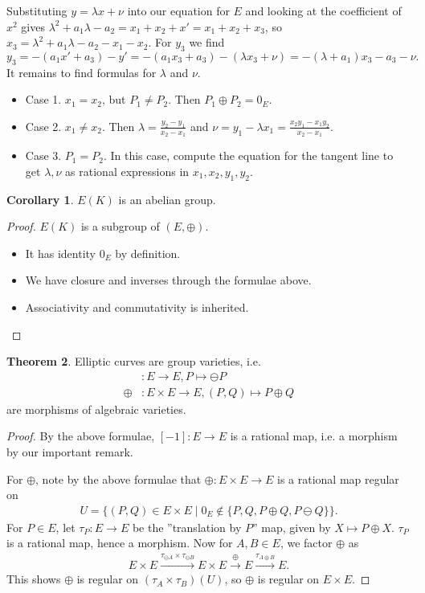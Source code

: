 \documentclass{article}
\theoremstyle{definition}
\newtheorem{theorem}{Theorem}[section]
\newtheorem{cor}[theorem]{Corollary}
\begin{document}
Substituting $y = \lambda x + \nu$ into our equation for $E$ and looking at the coefficient of $x^2$ gives $\lambda^2 + a_1 \lambda - a_2 = x_1 + x_2 + x' = x_1 + x_2 + x_3$, so $x_3 = \lambda^2 +a_1 \lambda - a_2 - x_1 - x_2$. For $y_3$ we find $$y_3 = -(a_1x' + a_3) - y' = -(a_1x_3+a_3) - (\lambda x_3  + \nu) = - (\lambda+a_1)x_3 - a_3 - \nu.$$
It remains to find formulas for $\lambda$ and $\nu$.
\begin{itemize}
    \item Case 1. $x_1 = x_2$, but $P_1 \neq P_2$. Then $P_1 \oplus P_2 = 0_E$.
    \item Case 2. $x_1 \neq x_2$. Then $\lambda = \frac{y_2-y_1}{x_2-x_1}$ and $\nu = y_1 - \lambda x_1 = \frac{x_2y_1-x_1y_2}{x_2-x_1}$.
    \item Case 3. $P_1 = P_2$. In this case, compute the equation for the tangent line to get $\lambda, \nu$ as rational expressions in $x_1,x_2,y_1,y_2$.
\end{itemize}
\begin{cor}
    $E(K)$ is an abelian group.
\end{cor}
\begin{proof}
    $E(K)$ is a subgroup of $(E, \oplus)$.
    \begin{itemize}
        \item It has identity $0_E$ by definition.
        \item We have closure and inverses through the formulae above.
        \item Associativity and commutativity is inherited.
    \end{itemize}
\end{proof}
\begin{theorem}\label{theorem4.4}
    Elliptic curves are group varieties, i.e. 
    \begin{align*}
        [-1]&:E \to E, P \mapsto \ominus P\\
        \oplus&: E \times E\to E, (P,Q) \mapsto P \oplus Q
    \end{align*}
    are morphisms of algebraic varieties.
\end{theorem}
\begin{proof}
    By the above formulae, $[-1]:E \to E$ is a rational map, i.e. a morphism by our important remark.
    \vspace{1mm}
     
    For $\oplus$, note by the above formulae that $\oplus : E \times E \to E$ is a rational map regular on 
    \begin{align*}
        U = \{(P,Q) \in E \times E \mid 0_E \not\in \{P,Q, P \oplus Q, P \ominus Q  \}\}.
    \end{align*}
    For $P \in E$, let $\tau_P : E \to E$ be the ''translation by $P$'' map, given by $X \mapsto P \oplus X$. $\tau_P$ is a rational map, hence a morphism. Now for $A, B \in E$, we factor $\oplus$ as 
    \begin{align*}
        E \times E \stackrel{\tau_{\ominus A} \times \tau_{\ominus B}}{\to} E \times E \stackrel{\oplus}{\to} E \stackrel{\tau_{A\oplus B}}{\to} E.  
    \end{align*}
    This shows $\oplus$ is regular on $(\tau_{A} \times \tau_B)(U)$, so $\oplus$ is regular on $E \times E$.
\end{proof}
\end{document}
